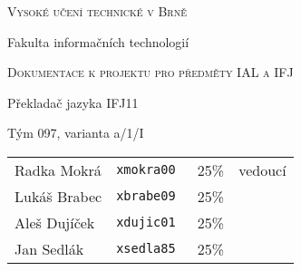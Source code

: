 \thispagestyle{empty}

\begin{center}
\Large{\scshape Vysoké učení technické v Brně}

\vspace{0.5cm}

\large{Fakulta informačních technologií}

\vfill

\Large{\scshape Dokumentace k projektu pro předměty IAL a IFJ}

%

\vfill

\LARGE{Překladač jazyka IFJ11}

\vfill

\large{Tým 097, varianta a/1/I}
\end{center}

\vspace{0.5cm}

\begin{tabular}{l l r l}
Radka Mokrá  & \tt{xmokra00} & 25\% & vedoucí \\ 
Lukáš Brabec & \tt{xbrabe09} & 25\% & \\
Aleš Dujíček & \tt{xdujic01} & 25\% & \\
Jan Sedlák   & \tt{xsedla85} & 25\% & \\
\end{tabular}


\newpage{}

